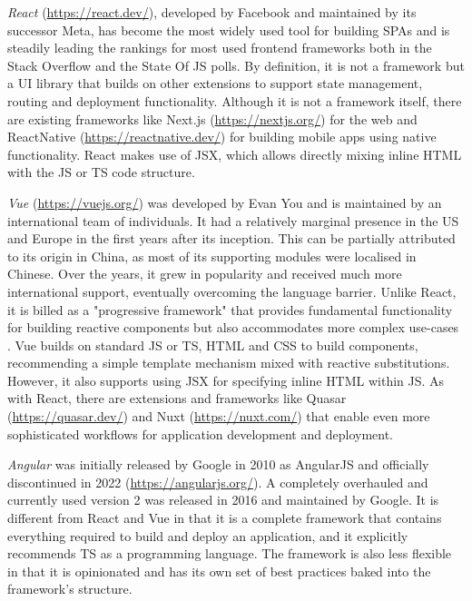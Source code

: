 \emph{React} (\url{https://react.dev/}), developed by Facebook and maintained by its successor Meta, has become the most widely used tool for building \ac{SPA}s and is steadily leading the rankings for most used frontend frameworks both in the Stack Overflow \parencite{stackOverflowPollWebFrameworks23} and the State Of JS \parencite{mostUsedFrontendFrameworks22} polls. By definition, it is not a framework but a \ac{UI} library that builds on other extensions to support state management, routing and deployment functionality. Although it is not a framework itself, there are existing frameworks like Next.js (\url{https://nextjs.org/}) for the web and ReactNative (\url{https://reactnative.dev/}) for building mobile apps using native functionality. React makes use of \ac{JSX}, which allows directly mixing inline \ac{HTML} with the \ac{JS} or \ac{TS} code structure.

\emph{Vue} (\url{https://vuejs.org/}) was developed by Evan You and is maintained by an international team of individuals. It had a relatively marginal presence in the US and Europe in the first years after its inception. This can be partially attributed to its origin in China, as most of its supporting modules were localised in Chinese. Over the years, it grew in popularity and received much more international support, eventually overcoming the language barrier. Unlike React, it is billed as a "progressive framework" that provides fundamental functionality for building reactive components but also accommodates more complex use-cases \parencite{vueProgressiveFramework}. Vue builds on standard \ac{JS} or \ac{TS}, \ac{HTML} and \ac{CSS} to build components, recommending a simple template mechanism mixed with reactive substitutions. However, it also supports using \ac{JSX} for specifying inline \ac{HTML} within \ac{JS}. As with React, there are extensions and frameworks like Quasar (\url{https://quasar.dev/}) and Nuxt (\url{https://nuxt.com/}) that enable even more sophisticated workflows for application development and deployment.

\emph{Angular} was initially released by Google in 2010 as AngularJS and officially discontinued in 2022 (\url{https://angularjs.org/}). A completely overhauled and currently used version 2 was released in 2016 and maintained by Google. It is different from React and Vue in that it is a complete framework that contains everything required to build and deploy an application, and it explicitly recommends \ac{TS} as a programming language. The framework is also less flexible in that it is opinionated and has its own set of best practices baked into the framework's structure.




